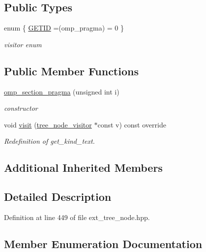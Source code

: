 \subsection*{Public Types}
\begin{DoxyCompactItemize}
\item 
enum \{ \hyperlink{structomp__section__pragma_a3ffe823a9327fe8a882bd7c8c232211eab23726486c733ed78bcde8f8733a95a2}{G\+E\+T\+ID} =(omp\+\_\+pragma) = 0
 \}\begin{DoxyCompactList}\small\item\em visitor enum \end{DoxyCompactList}
\end{DoxyCompactItemize}
\subsection*{Public Member Functions}
\begin{DoxyCompactItemize}
\item 
\hyperlink{structomp__section__pragma_a9018c5bd02b901872ff552d51e58527d}{omp\+\_\+section\+\_\+pragma} (unsigned int i)
\begin{DoxyCompactList}\small\item\em constructor \end{DoxyCompactList}\item 
void \hyperlink{structomp__section__pragma_af4ab9f80608c36b26779495aacc05e43}{visit} (\hyperlink{classtree__node__visitor}{tree\+\_\+node\+\_\+visitor} $\ast$const v) const override
\begin{DoxyCompactList}\small\item\em Redefinition of get\+\_\+kind\+\_\+text. \end{DoxyCompactList}\end{DoxyCompactItemize}
\subsection*{Additional Inherited Members}


\subsection{Detailed Description}


Definition at line 449 of file ext\+\_\+tree\+\_\+node.\+hpp.



\subsection{Member Enumeration Documentation}
\mbox{\label{structomp__section__pragma_a3ffe823a9327fe8a882bd7c8c232211e}} 
